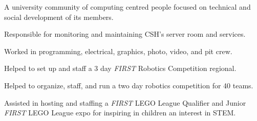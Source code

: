 \cvtag{\LaTeX}



\medskip
{}
A university community of computing centred people focused on technical and social development of its members.

Responsible for monitoring and maintaining CSH's server room and services.

\divider

Worked in programming, electrical, graphics, photo, video, and pit crew.









Helped to set up and staff a 3 day \textit{FIRST} Robotics Competition regional.

Helped to organize, staff, and run a two day robotics competition for 40 teams.

Assisted in hosting and staffing a \textit{FIRST} LEGO\textsuperscript{\textregistered} League Qualifier and Junior \textit{FIRST} LEGO League expo for inspiring in children an interest in STEM.


